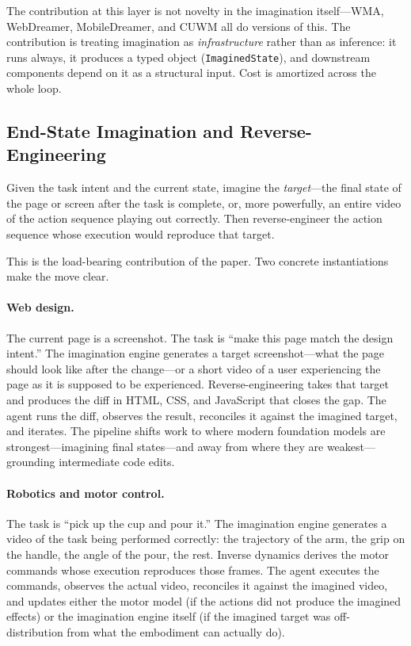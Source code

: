 \documentclass[12pt]{article}
\theoremstyle{definition}
\theoremstyle{remark}
\begin{document}
The contribution at this layer is not novelty in the imagination
itself---WMA, WebDreamer, MobileDreamer, and CUWM all do versions of
this. The contribution is treating imagination as
\emph{infrastructure} rather than as inference: it runs always, it
produces a typed object (\texttt{ImaginedState}), and downstream
components depend on it as a structural input. Cost is amortized
across the whole loop.

\subsection{End-State Imagination and Reverse-Engineering}
\label{subsec:end-state}

Given the task intent and the current state, imagine the
\emph{target}---the final state of the page or screen after the task
is complete, or, more powerfully, an entire video of the action
sequence playing out correctly. Then reverse-engineer the action
sequence whose execution would reproduce that target.

This is the load-bearing contribution of the paper. Two concrete
instantiations make the move clear.

\paragraph{Web design.}
The current page is a screenshot. The task is ``make this page match
the design intent.'' The imagination engine generates a target
screenshot---what the page should look like after the change---or a
short video of a user experiencing the page as it is supposed to be
experienced. Reverse-engineering takes that target and produces the
diff in HTML, CSS, and JavaScript that closes the gap. The agent
runs the diff, observes the result, reconciles it against the
imagined target, and iterates. The pipeline shifts work to where
modern foundation models are strongest---imagining final
states---and away from where they are weakest---grounding
intermediate code edits.

\paragraph{Robotics and motor control.}
The task is ``pick up the cup and pour it.'' The imagination engine
generates a video of the task being performed correctly: the
trajectory of the arm, the grip on the handle, the angle of the pour,
the rest. Inverse dynamics derives the motor commands whose execution
reproduces those frames. The agent executes the commands, observes
the actual video, reconciles it against the imagined video, and
updates either the motor model (if the actions did not produce the
imagined effects) or the imagination engine itself (if the imagined
target was off-distribution from what the embodiment can actually
do).
\end{document}

